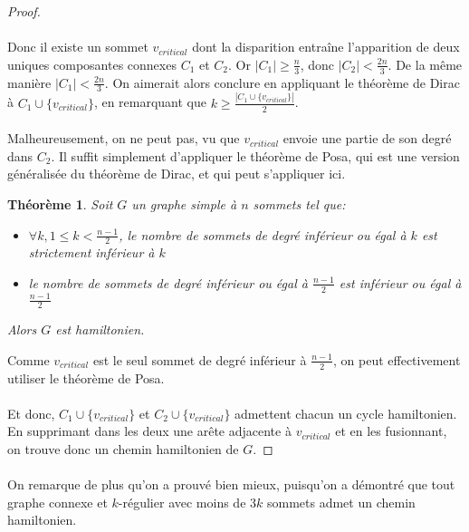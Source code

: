 \documentclass[a4paper]{article}
\newtheorem{theorem}{Théorème}
\theoremstyle{definition}
\theoremstyle{remark}
\begin{document}
\begin{proof}
\paragraph{}
Donc il existe un sommet $v_{critical}$ dont la disparition entraîne
l'apparition de deux uniques composantes connexes $C_{1}$ et $C_{2}$.
Or $|C_{1}| \geq \frac{n}{3}$, donc $|C_{2}| < \frac{2n}{3}$. De la même
manière $|C_{1}| < \frac{2n}{3}$. On aimerait alors conclure en 
appliquant le théorème de Dirac à $C_{1} \cup \{v_{critical}\}$, en remarquant que $k \geq \frac{|C_{1} \cup \{v_{critical}\}|}{2}$. 

\paragraph{}
Malheureusement, on ne peut pas, vu que $v_{critical}$ envoie une partie
de son degré dans $C_{2}$. Il suffit simplement d'appliquer le théorème
de Posa, qui est une version généralisée du théorème de Dirac, et qui 
peut s'appliquer ici.

\begin{theorem}
Soit $G$ un graphe simple à $n$ sommets tel que:
\begin{itemize}
\item $\forall k, 1 \leq k < \frac{n-1}{2}$, le nombre de sommets de degré inférieur ou égal à $k$ est strictement inférieur à $k$
\item le nombre de sommets de degré inférieur ou égal à $\frac{n-1}{2}$ est inférieur ou égal à $\frac{n-1}{2}$
\end{itemize}
Alors $G$ est hamiltonien.
\end{theorem}
Comme $v_{critical}$ est le seul sommet de degré inférieur à $\frac{n-1}{2}$, on peut effectivement utiliser le théorème de Posa.



\paragraph{}
Et donc, $C_{1} \cup \{v_{critical}\}$ et $C_{2} \cup \{v_{critical}\}$ 
admettent chacun un cycle hamiltonien. En supprimant dans les deux une
arête adjacente à $v_{critical}$ et en les fusionnant, on trouve donc un 
chemin hamiltonien de $G$.
\end{proof}

\paragraph{}
On remarque de plus  qu'on a prouvé bien mieux, puisqu'on a démontré que tout graphe connexe et $k$-régulier avec moins de $3k$ sommets admet un chemin hamiltonien. 
\end{document}
